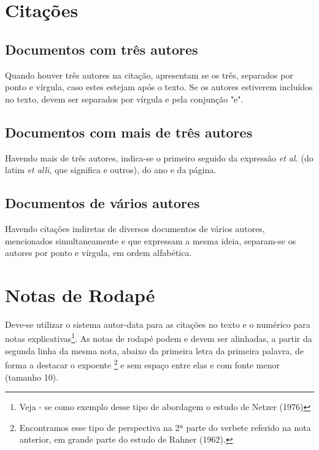 \section{Citações}

\subsection{Documentos com três autores}

Quando houver três autores na citação, apresentam se os três, separados por ponto e vírgula, caso estes estejam após o texto. Se os autores estiverem incluídos no texto, devem ser separados por vírgula e pela conjunção "e".


\cite{tresautores}

\subsection{Documentos com mais de três autores}
Havendo mais de três autores, indica-se o primeiro seguido da expressão \textit{et al.} (do latim \textit{et alli}, que significa e outros), do ano e da página.


\cite{quatroautores}

\subsection{Documentos de vários autores}

Havendo    citações    indiretas de    diversos    documentos    de    vários    autores, mencionados  simultaneamente e  que  expressam  a  mesma  ideia,  separam-se  os  autores  por ponto e vírgula, em ordem alfabética.

\cite{tresautores, quatroautores}

\section{Notas de Rodap\'{e}}

Deve-se utilizar o sistema autor-data para as  citações no texto e o numérico para notas explicativas\footnote{Veja - se como exemplo desse tipo de abordagem o estudo de Netzer (1976)}. As notas de rodapé podem e devem ser alinhadas, a partir da segunda linha da mesma nota, abaixo da primeira letra da primeira palavra, de forma a destacar o expoente \footnote{Encontramos  esse  tipo  de  perspectiva  na  2ª  parte  do  verbete  referido  na  nota  anterior,  em  grande  parte  do estudo de Rahner (1962).} e sem espaço entre elas e com fonte menor (tamanho 10).

